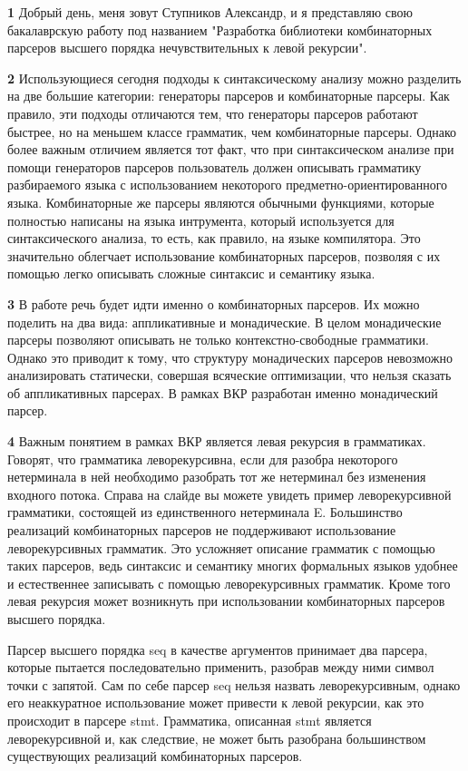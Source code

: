\documentclass[times]{itmo-student-thesis}
\begin{document}
\textbf{1} Добрый день, меня зовут Ступников Александр, и я представляю свою бакалаврскую работу под
названием "Разработка библиотеки комбинаторных парсеров высшего порядка нечувствительных к левой рекурсии".

\textbf{2} Использующиеся сегодня подходы к синтаксическому анализу можно разделить на две большие категории: генераторы парсеров
и комбинаторные парсеры. Как правило, эти подходы отличаются тем, что генераторы парсеров работают быстрее, но на меньшем
классе грамматик, чем комбинаторные парсеры. Однако более важным отличием является тот факт, что при синтаксическом
анализе при помощи генераторов парсеров пользователь должен описывать грамматику разбираемого языка с использованием
некоторого предметно-ориентированного языка. Комбинаторные же парсеры являются обычными функциями, которые полностью
написаны на языка интрумента, который используется  для синтаксического анализа, то есть, как правило, на языке
компилятора. Это значительно облегчает использование комбинаторных парсеров, позволяя с их помощью легко описывать
сложные синтаксис и семантику языка.

\textbf{3} В работе речь будет идти именно о комбинаторных парсеров. Их можно поделить на два вида: аппликативные и монадические.
В целом монадические парсеры позволяют описывать не только контекстно-свободные грамматики. Однако это приводит к тому,
что структуру монадических парсеров невозможно анализировать статически, совершая всяческие оптимизации, что нельзя
сказать об аппликативных парсерах. В рамках ВКР  разработан именно монадический парсер.

\textbf{4} Важным понятием в рамках ВКР является левая рекурсия в грамматиках. Говорят, что грамматика леворекурсивна, если для
разобра некоторого нетерминала в ней необходимо разобрать тот же нетерминал без изменения входного потока. Справа на
слайде вы можете увидеть пример леворекурсивной грамматики, состоящей из единственного нетерминала E. Большинство
реализаций  комбинаторных парсеров не поддерживают использование леворекурсивных грамматик. Это усложняет описание
грамматик с помощью таких парсеров, ведь синтаксис и семантику многих формальных языков удобнее и естественнее записывать с помощью
леворекурсивных грамматик. Кроме того левая рекурсия может возникнуть при использовании комбинаторных парсеров высшего
порядка.

Парсер высшего порядка seq в качестве аргументов принимает два парсера, которые пытается последовательно применить,
разобрав между ними символ точки с запятой. Сам по себе парсер seq нельзя назвать леворекурсивным, однако его
неаккуратное использование может привести к левой рекурсии, как это происходит в парсере stmt. Грамматика, описанная
stmt является леворекурсивной и, как следствие, не может быть разобрана большинством существующих реализаций
комбинаторных парсеров.
\end{document}
